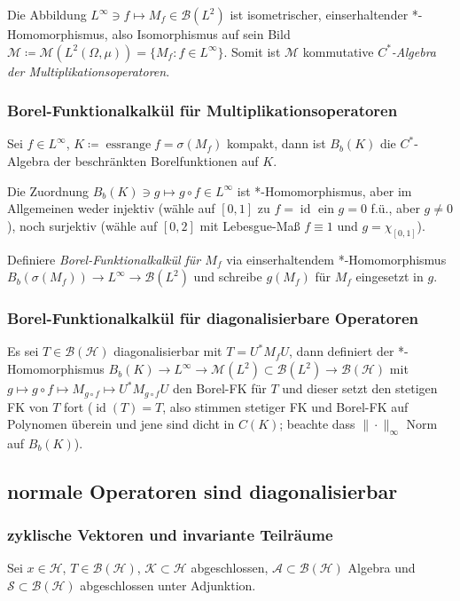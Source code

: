 \documentclass[11pt,a4paper]{scrartcl}
\newcommand{\Hc}{\mathcal{H}}
\newcommand{\Sc}{\mathcal{S}}
\newcommand{\Kc}{\mathcal{K}}
\newcommand{\A}{\mathcal{A}}
\newcommand{\B}{\mathcal{B}}
\newcommand{\M}{\mathcal{M}}
\theoremstyle{plain}
\theoremstyle{definition}
\theoremstyle{remark}
\DeclareMathOperator{\essrange}{ess range}
\DeclareMathOperator{\id}{id}
\begin{document}
Die Abbildung $L^\infty \ni f \mapsto M_f \in \B(L^2)$ ist isometrischer, einserhaltender *-Homomorphismus, also Isomorphismus auf sein Bild $\M\coloneqq \M(L^2(\Omega,\mu))=\{ M_f: f\in L^\infty \}$. Somit ist $\M$ kommutative \emph{$C^*$-Algebra der Multiplikationsoperatoren}.

\subsubsection{Borel-Funktionalkalkül für Multiplikationsoperatoren}

Sei $f\in L^\infty$, $K\coloneqq \essrange f = \sigma(M_f)$ kompakt, dann ist $B_b(K)$ die $C^*$-Algebra der beschränkten Borelfunktionen auf $K$. 

Die Zuordnung $B_b(K) \ni g \mapsto g\circ f \in L^\infty$ ist *-Homomorphismus, aber im Allgemeinen weder injektiv (wähle auf $[0,1]$ zu $f=\id$ ein $g=0$ f.ü., aber $g\neq 0$), noch surjektiv (wähle auf $[0,2]$ mit Lebesgue-Maß $f\equiv 1$ und $g=\chi_{[0,1]}$).

Definiere \emph{Borel-Funktionalkalkül für $M_f$} via einserhaltendem *-Homomorphismus $B_b(\sigma(M_f)) \to L^\infty \to \B(L^2)$ und schreibe $g(M_f)$ für $M_f$ eingesetzt in $g$. 

\subsubsection{Borel-Funktionalkalkül für diagonalisierbare Operatoren}

Es sei $T\in \B(\Hc)$ diagonalisierbar mit $T=U^*M_f U$, dann definiert der *-Homomorphismus $B_b(K)\to L^\infty \to \M(L^2) \subset \B(L^2) \to \B(\Hc)$ mit $g\mapsto g\circ f \mapsto M_{g\circ f} \mapsto U^* M_{g\circ f} U$ den Borel-FK für $T$ und dieser setzt den stetigen FK von $T$ fort ($\id(T)=T$, also stimmen stetiger FK und Borel-FK auf Polynomen überein und jene sind dicht in $C(K)$; beachte dass $\|\cdot\|_\infty$ Norm auf $B_b(K)$).

\subsection{normale Operatoren sind diagonalisierbar}

\subsubsection{zyklische Vektoren und invariante Teilräume}

Sei $x\in \Hc$, $T\in \B(\Hc)$, $\Kc \subset \Hc$ abgeschlossen, $\A \subset \B(\Hc)$ Algebra und $\Sc \subset \B(\Hc)$ abgeschlossen unter Adjunktion.
\end{document}
